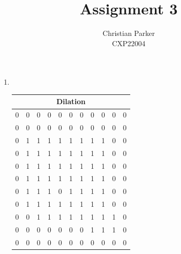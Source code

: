 \documentclass{article}
\title{Assignment 3}
\author{Christian Parker \\ CXP22004}
\begin{document}
\maketitle

\begin{enumerate}
    \item \ %
    \begin{center}
        \begin{tabular}{|c|c|c|c|c|c|c|c|c|c|c|}
        \multicolumn{11}{c}{\textbf{Dilation}} \\
        \hline
        0 & 0 & 0 & 0 & 0 & 0 & 0 & 0 & 0 & 0 & 0 \\
        \hline
        0 & 0 & 0 & 0 & 0 & 0 & 0 & 0 & 0 & 0 & 0 \\
        \hline
        0 & \cellcolor{blue!20}1 & \cellcolor{blue!20}1 & \cellcolor{blue!20}1 & \cellcolor{blue!20}1 & \cellcolor{blue!20}1 & \cellcolor{blue!20}1 & \cellcolor{blue!20}1 & \cellcolor{blue!20}1 & 0 & 0 \\
        \hline
        0 & \cellcolor{blue!20}1 & \cellcolor{blue!20}1 & \cellcolor{blue!20}1 & \cellcolor{blue!20}1 & \cellcolor{blue!20}1 & \cellcolor{blue!20}1 & \cellcolor{blue!20}1 & \cellcolor{blue!20}1 & 0 & 0 \\
        \hline
        0 & \cellcolor{blue!20}1 & \cellcolor{blue!20}1 & \cellcolor{blue!20}1 & \cellcolor{blue!20}1 & \cellcolor{blue!20}1 & \cellcolor{blue!20}1 & \cellcolor{blue!20}1 & \cellcolor{blue!20}1 & 0 & 0 \\
        \hline
        0 & \cellcolor{blue!20}1 & \cellcolor{blue!20}1 & \cellcolor{blue!20}1 & \cellcolor{blue!20}1 & \cellcolor{blue!20}1 & \cellcolor{blue!20}1 & \cellcolor{blue!20}1 & \cellcolor{blue!20}1 & 0 & 0 \\
        \hline
        0 & \cellcolor{blue!20}1 & \cellcolor{blue!20}1 & \cellcolor{blue!20}1 & 0 & \cellcolor{blue!20}1 & \cellcolor{blue!20}1 & \cellcolor{blue!20}1 & \cellcolor{blue!20}1 & 0 & 0 \\
        \hline
        0 & \cellcolor{blue!20}1 & \cellcolor{blue!20}1 & \cellcolor{blue!20}1 & \cellcolor{blue!20}1 & \cellcolor{blue!20}1 & \cellcolor{blue!20}1 & \cellcolor{blue!20}1 & \cellcolor{blue!20}1 & 0 & 0 \\
        \hline
        0 & 0 & \cellcolor{blue!20}1 & \cellcolor{blue!20}1 & \cellcolor{blue!20}1 & \cellcolor{blue!20}1 & \cellcolor{blue!20}1 & \cellcolor{blue!20}1 & \cellcolor{blue!20}1 & \cellcolor{blue!20}1 & 0 \\
        \hline
        0 & 0 & 0 & 0 & 0 & 0 & 0 & \cellcolor{blue!20}1 & \cellcolor{blue!20}1 & \cellcolor{blue!20}1 & 0 \\
        \hline
        0 & 0 & 0 & 0 & 0 & 0 & 0 & 0 & 0 & 0 & 0 \\
        \hline
        \end{tabular}
    \end{center}


\end{enumerate}
\end{document}
